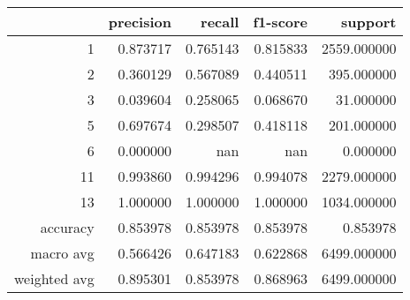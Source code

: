 \begin{tabular}{rrrrr}
\toprule
 & precision & recall & f1-score & support \\
\midrule
1 & 0.873717 & 0.765143 & 0.815833 & 2559.000000 \\
2 & 0.360129 & 0.567089 & 0.440511 & 395.000000 \\
3 & 0.039604 & 0.258065 & 0.068670 & 31.000000 \\
5 & 0.697674 & 0.298507 & 0.418118 & 201.000000 \\
6 & 0.000000 & nan & nan & 0.000000 \\
11 & 0.993860 & 0.994296 & 0.994078 & 2279.000000 \\
13 & 1.000000 & 1.000000 & 1.000000 & 1034.000000 \\
accuracy & 0.853978 & 0.853978 & 0.853978 & 0.853978 \\
macro avg & 0.566426 & 0.647183 & 0.622868 & 6499.000000 \\
weighted avg & 0.895301 & 0.853978 & 0.868963 & 6499.000000 \\
\bottomrule
\end{tabular}
